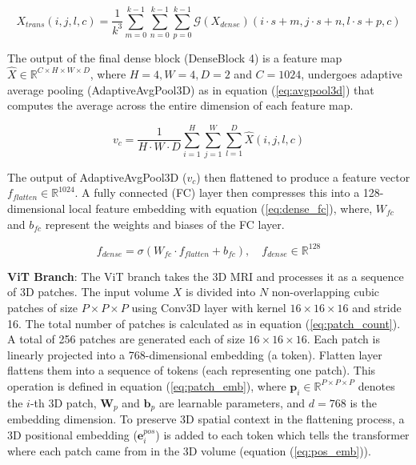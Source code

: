 \documentclass[12pt]{article}
\begin{document}
\begin{equation} \label{eq:transition} 
X_{trans}(i, j, l, c) = \frac{1}{k^3} \sum_{m=0}^{k-1} \sum_{n=0}^{k-1} \sum_{p=0}^{k-1} \mathcal{G}(X_{dense})(i \cdot s + m,j \cdot s + n,l \cdot s + p,c) \end{equation}

The output of the final dense block (DenseBlock 4) is a feature map $\hat{X} \in \mathbb{R}^{C \times H \times W \times D}$, where $H=4, W=4, D=2$ and $C=1024$, undergoes adaptive average pooling (AdaptiveAvgPool3D) as in equation (\ref{eq:avgpool3d}) that computes the average across the entire dimension of each feature map. 

\begin{equation} \label{eq:avgpool3d} 
v_c = \frac{1}{H \cdot W \cdot D} \sum_{i=1}^{H} \sum_{j=1}^{W} \sum_{l=1}^{D} \hat{X}{(i,j,l,c)}
\end{equation}

The output of AdaptiveAvgPool3D ($v_c$) then flattened to produce a feature vector $f_{flatten} \in \mathbb{R}^{1024}$. A fully connected (FC) layer then compresses this into a 128-dimensional local feature embedding with equation (\ref{eq:dense_fc}), where, $W_{fc}$ and $b_{fc}$ represent the weights and biases of the FC layer.

\begin{equation} \label{eq:dense_fc} 
f_{dense} = \sigma(W_{fc} \cdot f_{flatten} + b_{fc}), \quad
f_{dense} \in \mathbb{R}^{128}
\end{equation}

\textbf{ViT Branch}: The ViT branch takes the 3D MRI and processes it as a sequence of 3D patches. The input volume $X$ is divided into $N$ non-overlapping cubic patches of size $P \times P \times P$ using Conv3D layer with kernel $16 \times 16 \times 16$ and stride 16. The total number of patches is calculated as in equation (\ref{eq:patch_count}). A total of 256 patches are generated each of size $16 \times 16 \times 16$. Each patch is linearly projected into a 768-dimensional embedding (a token). Flatten layer flattens them into a sequence of tokens (each representing one patch). This operation is defined in equation (\ref{eq:patch_emb}), where $\mathbf{p}_i \in \mathbb{R}^{P \times P \times P}$ denotes the $i$-th 3D patch, 
$\mathbf{W}_p$ and $\mathbf{b}_p$ are learnable parameters, and $d = 768$ is the embedding dimension. To preserve 3D spatial context in the flattening process, a 3D positional embedding ($\mathbf{e}_i^{pos}$) is added to each token which tells the transformer where each patch came from in the 3D volume (equation (\ref{eq:pos_emb})).
\end{document}
